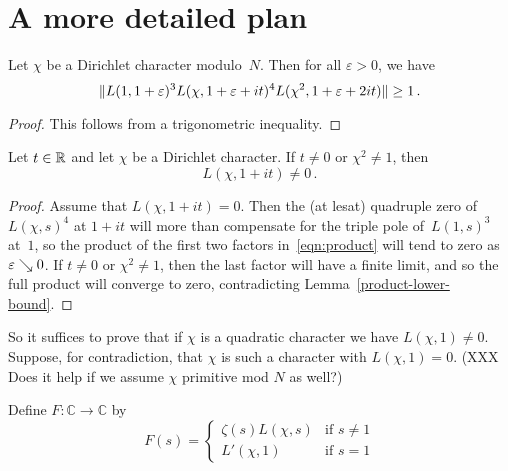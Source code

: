 \section{A more detailed plan}

\begin{lemma} \label{product-lower-bound}
  \leanok
  Let $\chi$ be a Dirichlet character modulo~$N$. Then for all $\varepsilon > 0$, we have
  \begin{equation} \label {eqn:product}
    \|L(1, 1 + \varepsilon)^3 L(\chi, 1 + \varepsilon + it)^4 L(\chi^2, 1 + \varepsilon + 2it)\| \ge 1 \,.
  \end{equation}
\end{lemma}

\begin{proof}
  \leanok
  This follows from a trigonometric inequality.
\end{proof}

\begin{lemma} \label{non-quadratic}
  Let $t \in \mathbb{R}$ and let $\chi$ be a Dirichlet character. If $t \ne 0$ or $\chi^2 \ne 1$, then
  \[ L(\chi, 1 + it) \ne 0 \,. \]
\end{lemma}

\begin{proof}
  Assume that $L(\chi, 1 + it) = 0$. Then the (at lesat) quadruple zero of~$L(\chi, s)^4$ at $1 + it$
  will more than compensate for the triple pole of~$L(1, s)^3$ at~$1$, so the product of the first
  two factors in~\eqref{eqn:product} will tend to zero as $\varepsilon \searrow 0$.
  If $t \ne 0$ or $\chi^2 \ne 1$, then the last factor will have a finite limit, and so the
  full product will converge to zero, contradicting Lemma~\ref{product-lower-bound}.
\end{proof}


 So it suffices to prove that if $\chi$ is a quadratic character we have $L(\chi, 1) \ne 0$. Suppose, for contradiction, that $\chi$ is such a character with $L(\chi, 1) = 0$. (XXX Does it help if we assume $\chi$ primitive mod $N$ as well?)

 \begin{definition}
  Define $F : \mathbb{C} \to \mathbb{C}$ by
  \[ F(s) = \begin{cases}
   \zeta(s) L(\chi, s) & \text{if $s \ne 1$} \\
   L'(\chi, 1) & \text{if $s = 1$}
   \end{cases}
  \]
 \end{definition}

